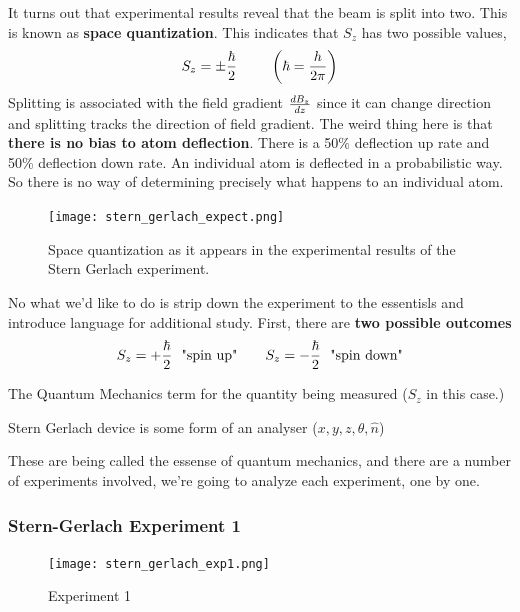 \documentclass[english, 11pt]{article}
\begin{document}
       It turns out that experimental results reveal that the beam is split into two. This is known as \textbf{space quantization}. This indicates that $S_z$ has two possible values,
       \[ S_z = \pm \frac{\hbar}{2} \ \ \ \ \ \ \ \left( \hbar = \frac{h}{2\pi} \right) \]
       Splitting is associated with the field gradient $\frac{dB_z}{dz}$ since it can change direction and splitting tracks the direction of field gradient. The weird thing here is that \textbf{there is no bias to atom deflection}. There is a 50\% deflection up rate and 50\% deflection down rate. An individual atom is deflected in a probabilistic way. So there is no way of determining precisely what happens to an individual atom.

       \begin{figure}[t!]
          \centering
          \texttt{[image: stern\_gerlach\_expect.png]}
          \caption{Space quantization as it appears in the experimental results of the Stern Gerlach experiment.}
       \end{figure}

       No what we'd like to do is strip down the experiment to the essentisls and introduce language for additional study. First, there are \textbf{two possible outcomes}
       \[ S_z = + \f{\hbar}{2} \ \ \mbox{"spin up"} \ \ \ \ \ \ S_z = - \f{\hbar}{2} \ \ \mbox{"spin down"}  \]
       \begin{defn}[observable]\label{observable}
       The Quantum Mechanics term for the quantity being measured ($S_z$ in this case.)
       \end{defn}
       \begin{defn}[analyser]\label{analyser}
       Stern Gerlach device is some form of an analyser ($x, y, z, \theta, \hat{n}$)
       \end{defn}

       These are being called the essense of quantum mechanics, and there are a number of experiments involved, we're going to analyze each experiment, one by one.

       \subsubsection{Stern-Gerlach Experiment 1}

         \begin{figure}[t!]
            \centering
            \texttt{[image: stern\_gerlach\_exp1.png]}
            \caption{Experiment 1}
         \end{figure}
\end{document}
